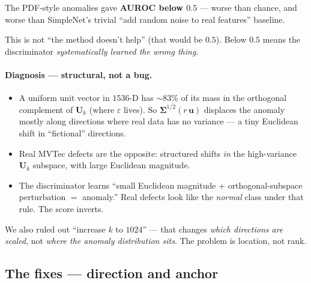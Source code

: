\documentclass[11pt]{article}
\newcommand{\Uk}{\mathbf{U}_k}
\newcommand{\bSigma}{\boldsymbol{\Sigma}}
\begin{document}
The PDF-style anomalies gave \textbf{AUROC below $0.5$} --- worse than chance, and
worse than SimpleNet's trivial ``add random noise to real features'' baseline.

This is not ``the method doesn't help'' (that would be $0.5$). Below $0.5$ means
the discriminator \emph{systematically learned the wrong thing.}

\paragraph{Diagnosis --- structural, not a bug.}
\begin{itemize}[noitemsep]
  \item A uniform unit vector in $1536$-D has ${\sim}83\%$ of its mass in the
    orthogonal complement of $\Uk$ (where $\varepsilon$ lives). So
    $\bSigma^{1/2}(r\,\mathbf{u})$ displaces the anomaly mostly along directions
    where real data has no variance --- a tiny Euclidean shift in ``fictional''
    directions.
  \item Real MVTec defects are the opposite: structured shifts \emph{in} the
    high-variance $\Uk$ subspace, with large Euclidean magnitude.
  \item The discriminator learns ``small Euclidean magnitude + orthogonal-subspace
    perturbation $=$ anomaly.'' Real defects look like the \emph{normal} class
    under that rule. The score inverts.
\end{itemize}
We also ruled out ``increase $k$ to $1024$'' --- that changes \emph{which
directions are scaled}, not \emph{where the anomaly distribution sits}. The
problem is location, not rank.

\subsection{The fixes --- direction and anchor}
\end{document}
